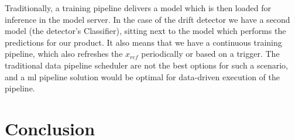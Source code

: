\documentclass[12pt]{report}
\begin{document}
Traditionally, a training pipeline delivers a model which is then loaded for inference in the model server.
In the case of the drift detector we have a second model (the detector's Classifier), sitting next to the model which performs the predictions for our product.
It also means that we have a continuous training pipeline, which also refreshes the \(x_{ref}\) periodically or based on a trigger.
The traditional data pipeline scheduler are not the best options for such a scenario, and a ml pipeline solution would be optimal \cite{baylorContinuousTrainingProduction2019} for data-driven execution of the pipeline.


\chapter{Conclusion}


\end{document}
